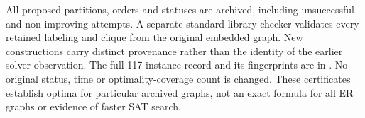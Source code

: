 All proposed partitions, orders and statuses are archived, including
unsuccessful and non-improving attempts. A separate standard-library
checker validates every retained labeling and clique from the original
embedded graph. New constructions carry distinct provenance rather than
the identity of the earlier solver observation. The full 117-instance
record and its fingerprints are in .
No original status, time or optimality-coverage count is changed.
These certificates establish optima for particular archived graphs,
not an exact formula for all ER graphs or evidence of faster SAT search.
\FloatBarrier
